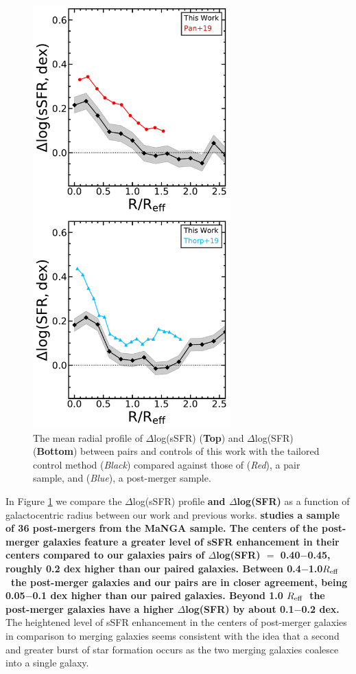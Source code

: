 \documentclass[iop,revtex4,twocolumn,apj,numberedappendix,appendixfloats]{emulateapj}
\newcommand{\reff}{$R_{\rm eff}$}
\begin{document}
\begin{figure}
\centering
\includegraphics[width=3in]{fig/prof_comp.pdf}
\caption[]{The mean radial profile of $\Delta$log(sSFR) (\textbf{Top}) and $\Delta$log(SFR) (\textbf{Bottom}) between pairs and controls of this work with the tailored control method ({\it Black}) compared against those of \citet{Pan:2019} ({\it Red}), a pair sample, and \citet{Thorp:2019} ({\it Blue}), a post-merger sample.}
\label{fig:prof_comp}
\end{figure}

In Figure \ref{fig:prof_comp} we compare the $\Delta$log(sSFR) profile \textbf{and $\Delta$log(SFR)} as a function of galactocentric radius between our work and previous works. \textbf{\citet{Thorp:2019} studies a sample of 36 post-mergers from the MaNGA sample. The centers of the post-merger galaxies feature a greater level of sSFR enhancement in their centers compared to our galaxies pairs of $\Delta$log(SFR) $=$ 0.40$-$0.45, roughly 0.2 dex higher than our paired galaxies. Between 0.4$-$1.0\reff\ the post-merger galaxies and our pairs are in closer agreement, being 0.05$-$0.1 dex higher than our paired galaxies. Beyond 1.0 \reff\ the post-merger galaxies have a higher $\Delta$log(SFR) by about 0.1$-$0.2 dex.} The heightened level of sSFR enhancement in the centers of post-merger galaxies in comparison to merging galaxies seems consistent with the idea that a second and greater burst of star formation occurs as the two merging galaxies coalesce into a single galaxy. 
\end{document}
